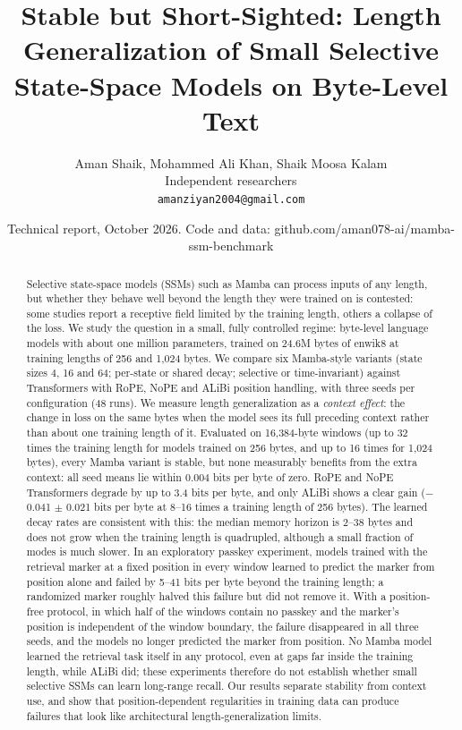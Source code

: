 \documentclass[11pt]{article}
\title{Stable but Short-Sighted: Length Generalization of Small Selective State-Space Models on Byte-Level Text}
\author{Aman Shaik, Mohammed Ali Khan, Shaik Moosa Kalam\\ \small Independent researchers\\ \texttt{amanziyan2004@gmail.com}}
\date{Technical report, October 2026. Code and data: github.com/aman078-ai/mamba-ssm-benchmark}
\begin{document}
\maketitle
\begin{abstract}

Selective state-space models (SSMs) such as Mamba can process inputs of any length, but whether they behave well beyond the length they were trained on is contested: some studies report a receptive field limited by the training length, others a collapse of the loss. We study the question in a small, fully controlled regime: byte-level language models with about one million parameters, trained on 24.6M bytes of enwik8 at training lengths of 256 and 1,024 bytes. We compare six Mamba-style variants (state sizes 4, 16 and 64; per-state or shared decay; selective or time-invariant) against Transformers with RoPE, NoPE and ALiBi position handling, with three seeds per configuration (48 runs). We measure length generalization as a \emph{context effect}: the change in loss on the same bytes when the model sees its full preceding context rather than about one training length of it. Evaluated on 16,384-byte windows (up to 32 times the training length for models trained on 256 bytes, and up to 16 times for 1,024 bytes), every Mamba variant is stable, but none measurably benefits from the extra context: all seed means lie within 0.004 bits per byte of zero. RoPE and NoPE Transformers degrade by up to 3.4 bits per byte, and only ALiBi shows a clear gain ($-$0.041 $\pm$ 0.021 bits per byte at 8--16 times a training length of 256 bytes). The learned decay rates are consistent with this: the median memory horizon is 2--38 bytes and does not grow when the training length is quadrupled, although a small fraction of modes is much slower. In an exploratory passkey experiment, models trained with the retrieval marker at a fixed position in every window learned to predict the marker from position alone and failed by 5--41 bits per byte beyond the training length; a randomized marker roughly halved this failure but did not remove it. With a position-free protocol, in which half of the windows contain no passkey and the marker's position is independent of the window boundary, the failure disappeared in all three seeds, and the models no longer predicted the marker from position. No Mamba model learned the retrieval task itself in any protocol, even at gaps far inside the training length, while ALiBi did; these experiments therefore do not establish whether small selective SSMs can learn long-range recall. Our results separate stability from context use, and show that position-dependent regularities in training data can produce failures that look like architectural length-generalization limits.

\end{abstract}
\end{document}
